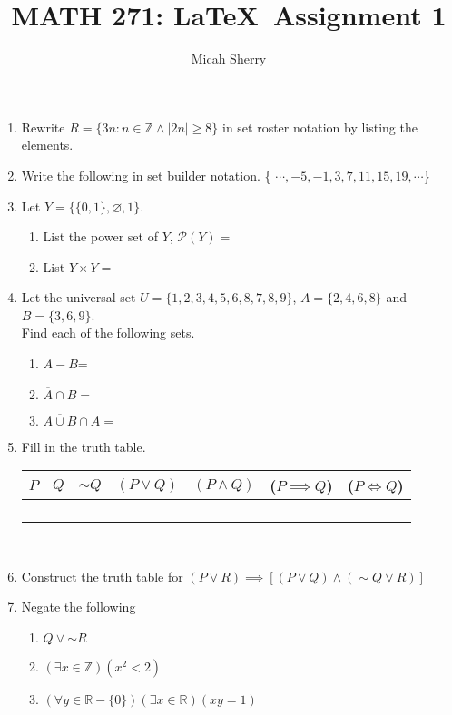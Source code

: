 \documentclass{article}
\title{MATH 271: \LaTeX \ Assignment 1}
\author{Micah Sherry}
\newcommand{\ints}{\mathbb{Z}}
\newcommand{\reals}{\mathbb{R}}
\newcommand{\nullset}{\varnothing}
\newcommand{\powerset}[1]{\mathcal{P}({#1})}
\begin{document}
	\maketitle
	
\begin{enumerate}
	\item Rewrite $R= \{3n:n \in \ints \wedge |2n| \ge 8\}$ in set roster notation by listing the elements.
	
	\item Write the following in set builder notation. \{ $\cdots, -5,-1,3,7,11,15,19,\cdots$\}
	
	\item Let $Y=\{ \{0,1\},\nullset, 1\}$.
		\begin{enumerate}
			\item List the power set of $Y$, $\powerset{Y}=$
			\item List $Y \times Y=$
		\end{enumerate}
		
	\item Let the universal set $U=\{1,2,3,4,5,6,8,7,8,9\}$, $A=\{2,4,6,8\}$ and $B=\{3,6,9\}$. \\ 
	Find each of the following sets.
	
		\begin{enumerate}
			\item $A-B$=
			\item $\overline{A} \cap B=$
			\item $\overline{A\cup B}\cap A=$
		\end{enumerate}
	
	\item Fill in the truth table.
	
		\begin{tabular}{|p{.12\linewidth}|p{.12\linewidth}|p{.12\linewidth}|p{.12\linewidth}|p{.12\linewidth}|p{.12\linewidth}|p{.12\linewidth}|}
		\hline
		$P$ & $Q$&  $\sim Q$ & $(P \vee Q)$& $(P \wedge Q)$ & ($P \implies Q$) & ($P \iff Q$) \\
		\hline 
		& & & & & &\\
		\hline
		& & & & & &\\
		\hline
		& & & & & &\\
		\hline
		& & & & & &\\
		\hline
		\end{tabular}
		\\
		
	\item Construct the truth table for $(P \vee R) \implies [ (P \vee Q) \wedge(\sim Q \vee R)]$
	
	\item Negate the following
	
	\begin{enumerate}
		\item $ Q \vee {\sim R} $
		\item $(\exists x \in \ints)(x^2<2)$
		\item $(\forall y \in \reals - \{0\})(\exists x \in \reals)(xy=1)$ 
	\end{enumerate}

\end{enumerate}
\end{document}
